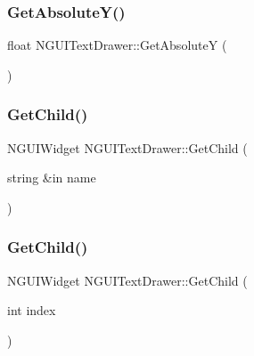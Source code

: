 \hypertarget{class_n_g_u_i_text_drawer_a7aae9ac2ea637f26e10830bdf6136304}{}\label{class_n_g_u_i_text_drawer_a7aae9ac2ea637f26e10830bdf6136304} 
\subsubsection{\texorpdfstring{Get\+Absolute\+Y()}{GetAbsoluteY()}}
{\footnotesize\ttfamily float N\+G\+U\+I\+Text\+Drawer\+::\+Get\+AbsoluteY (\begin{DoxyParamCaption}{ }\end{DoxyParamCaption})}

\hypertarget{class_n_g_u_i_text_drawer_af6994f70057afc73e12ab6ed2d0cbdf3}{}\label{class_n_g_u_i_text_drawer_af6994f70057afc73e12ab6ed2d0cbdf3} 
\subsubsection{\texorpdfstring{Get\+Child()}{GetChild()}\hspace{0.1cm}{\footnotesize\ttfamily [1/2]}}
{\footnotesize\ttfamily N\+G\+U\+I\+Widget N\+G\+U\+I\+Text\+Drawer\+::\+Get\+Child (\begin{DoxyParamCaption}\item[{string \&in}]{name }\end{DoxyParamCaption})}

\hypertarget{class_n_g_u_i_text_drawer_a889ab00433320e1b5955d832e0aef192}{}\label{class_n_g_u_i_text_drawer_a889ab00433320e1b5955d832e0aef192} 
\subsubsection{\texorpdfstring{Get\+Child()}{GetChild()}\hspace{0.1cm}{\footnotesize\ttfamily [2/2]}}
{\footnotesize\ttfamily N\+G\+U\+I\+Widget N\+G\+U\+I\+Text\+Drawer\+::\+Get\+Child (\begin{DoxyParamCaption}\item[{int}]{index }\end{DoxyParamCaption})}

